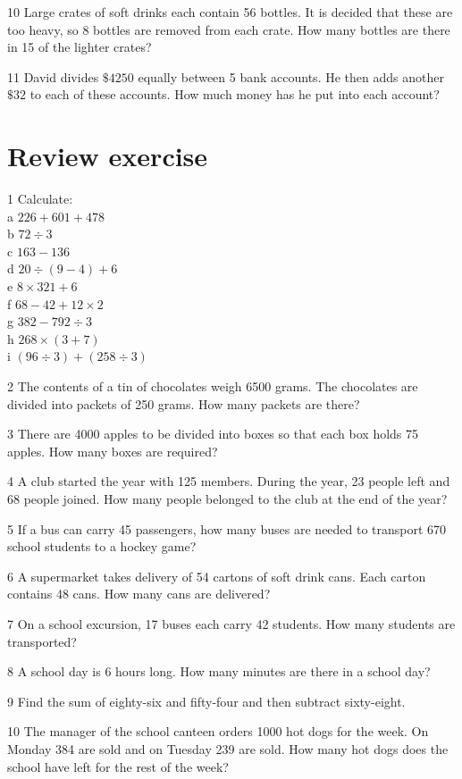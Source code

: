 \documentclass[10pt]{article}
\begin{document}
10 Large crates of soft drinks each contain 56 bottles. It is decided that these are too heavy, so 8 bottles are removed from each crate. How many bottles are there in 15 of the lighter crates?

11 David divides \(\$ 4250\) equally between 5 bank accounts. He then adds another \(\$ 32\) to each of these accounts. How much money has he put into each account?

\section*{Review exercise}
1 Calculate:\\
a \(226+601+478\)\\
b \(72 \div 3\)\\
c \(163-136\)\\
d \(20 \div(9-4)+6\)\\
e \(8 \times 321+6\)\\
f \(68-42+12 \times 2\)\\
g \(382-792 \div 3\)\\
h \(268 \times(3+7)\)\\
i \((96 \div 3)+(258 \div 3)\)

2 The contents of a tin of chocolates weigh 6500 grams. The chocolates are divided into packets of 250 grams. How many packets are there?

3 There are 4000 apples to be divided into boxes so that each box holds 75 apples. How many boxes are required?

4 A club started the year with 125 members. During the year, 23 people left and 68 people joined. How many people belonged to the club at the end of the year?

5 If a bus can carry 45 passengers, how many buses are needed to transport 670 school students to a hockey game?

6 A supermarket takes delivery of 54 cartons of soft drink cans. Each carton contains 48 cans. How many cans are delivered?

7 On a school excursion, 17 buses each carry 42 students. How many students are transported?

8 A school day is 6 hours long. How many minutes are there in a school day?

9 Find the sum of eighty-six and fifty-four and then subtract sixty-eight.

10 The manager of the school canteen orders 1000 hot dogs for the week. On Monday 384 are sold and on Tuesday 239 are sold. How many hot dogs does the school have left for the rest of the week?
\end{document}
